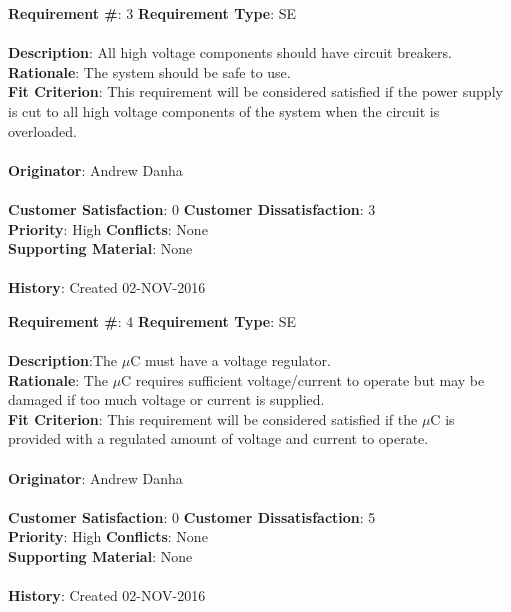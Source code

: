 \documentclass[titlepage]{article}
\begin{document}
\begin{framed}
	\noindent\textbf{Requirement \#}: 3 \hfill \textbf{Requirement Type}: SE \hfill\\\\
	\noindent\textbf{Description}: All high voltage components should have circuit breakers.\\
	\textbf{Rationale}: The system should be safe to use.\\
	\textbf{Fit Criterion}: This requirement will be considered satisfied if the power supply is cut to all high voltage components of the system when the circuit is overloaded.\\\\
	\textbf{Originator}: Andrew Danha\\\\
	\noindent\textbf{Customer Satisfaction}: 0 \hfill 	\textbf{Customer Dissatisfaction}: 3 \hfill\\
	\textbf{Priority}: High \hfill \textbf{Conflicts}: None \hfill\\
	\textbf{Supporting Material}: None\\\\
	\noindent\textbf{History}: Created 02-NOV-2016
\end{framed}

\begin{framed}
	\noindent\textbf{Requirement \#}: 4 \hfill \textbf{Requirement Type}: SE \hfill\\\\
	\noindent\textbf{Description}:The $\mu$C must have a voltage regulator.\\
	\textbf{Rationale}: The $\mu$C requires sufficient voltage/current to operate but may be damaged if too much voltage or current is supplied.\\
	\textbf{Fit Criterion}: This requirement will be considered satisfied if the $\mu$C is provided with a regulated amount of voltage and current to operate.\\\\
	\textbf{Originator}: Andrew Danha\\\\ 
	\noindent\textbf{Customer Satisfaction}: 0 \hfill 	\textbf{Customer Dissatisfaction}: 5 \hfill\\
	\textbf{Priority}: High \hfill \textbf{Conflicts}: None \hfill\\
	\textbf{Supporting Material}: None\\\\
	\noindent\textbf{History}: Created 02-NOV-2016
\end{framed}
\end{document}
